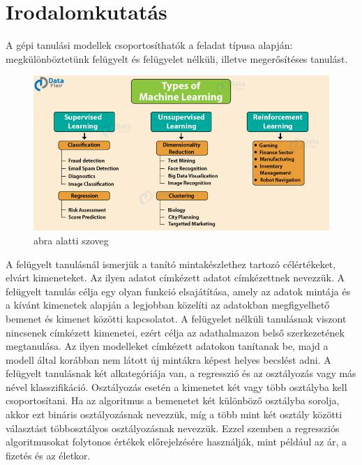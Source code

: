 \section{Irodalomkutatás}



A gépi tanulási modellek csoportosíthatók a feladat típusa alapján: megkülönböztetünk felügyelt és felügyelet nélküli, illetve megerősítéses tanulást.

\begin{figure}[h]
	\centering
	\includegraphics[width=1\columnwidth]{figures/machine_learning_types.png}
	\caption{abra alatti szoveg}
\end{figure}

A felügyelt tanulásnál ismerjük a tanító mintakészlethez tartozó célértékeket, elvárt kimeneteket. Az ilyen adatot címkézett adatot címkézettnek nevezzük. A felügyelt tanulás célja egy olyan funkció elsajátítása, amely az adatok mintája és a kívánt kimenetek alapján a legjobban közelíti az adatokban megfigyelhető bemenet és kimenet közötti kapcsolatot. A felügyelet nélküli tanulásnak viszont nincsenek címkézett kimenetei, ezért célja az adathalmazon belső szerkezetének megtanulása. Az ilyen modelleket címkézett adatokon tanítanak be, majd a modell által korábban nem látott új mintákra képest helyes becslést adni. A felügyelt tanulásnak két alkategóriája van, a regresszió és az osztályozás vagy más nével klasszifikáció. Osztályozás esetén a kimenetet két vagy több osztályba kell csoportosítani. Ha az algoritmus a bemenetet két különböző osztályba sorolja, akkor ezt bináris osztályozásnak nevezzük, míg a több mint két osztály közötti választást többosztályos osztályozásnak nevezzük. Ezzel szemben a regressziós algoritmusokat folytonos értékek előrejelzésére használják, mint például az ár, a fizetés és az életkor.
 
